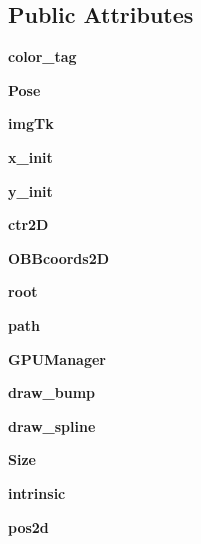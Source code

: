 \subsection*{Public Attributes}
\begin{DoxyCompactItemize}
\item 
\mbox{\label{class_application_1_1_application_a643b31e93e0bc05341e57ba468b4f6f3}} 
{\bfseries color\+\_\+tag}
\item 
\mbox{\label{class_application_1_1_application_ada6d6879848e900c1850c9392c4f470e}} 
{\bfseries Pose}
\item 
\mbox{\label{class_application_1_1_application_aca0834aa1c44002fe610ebc80dec0ecc}} 
{\bfseries img\+Tk}
\item 
\mbox{\label{class_application_1_1_application_a73a85463ff9f37fdf7b37c6a8ddfc6b9}} 
{\bfseries x\+\_\+init}
\item 
\mbox{\label{class_application_1_1_application_a29a38708c2931c1bf01e083580d6cb65}} 
{\bfseries y\+\_\+init}
\item 
\mbox{\label{class_application_1_1_application_a224f9ee994b50b04544ef4a672e63ed4}} 
{\bfseries ctr2D}
\item 
\mbox{\label{class_application_1_1_application_a51bf1a1fd9739a8b1ac39ee6cab97f56}} 
{\bfseries O\+B\+Bcoords2D}
\item 
\mbox{\label{class_application_1_1_application_af0ed58988ec61974ed3df13e0efadd48}} 
{\bfseries root}
\item 
\mbox{\label{class_application_1_1_application_afdc18a45655b60e479c8e8abdff0d817}} 
{\bfseries path}
\item 
\mbox{\label{class_application_1_1_application_a642089891b00ec772170b0cc4b71431d}} 
{\bfseries G\+P\+U\+Manager}
\item 
\mbox{\label{class_application_1_1_application_ac0a98c12024e47d785358ef75fded13a}} 
{\bfseries draw\+\_\+bump}
\item 
\mbox{\label{class_application_1_1_application_aa89a81a42a52f24b4c9816cabd80e303}} 
{\bfseries draw\+\_\+spline}
\item 
\mbox{\label{class_application_1_1_application_a6b35840e9d7dda2ffb68b21f05f69825}} 
{\bfseries Size}
\item 
\mbox{\label{class_application_1_1_application_ad9df94fccad5a2ab7c7289fd03e11cc8}} 
{\bfseries intrinsic}
\item 
\mbox{\label{class_application_1_1_application_a5621b526d04bbb3e01c79aa2de0f6f70}} 
{\bfseries pos2d}
\item 

\end{DoxyCompactItemize}
